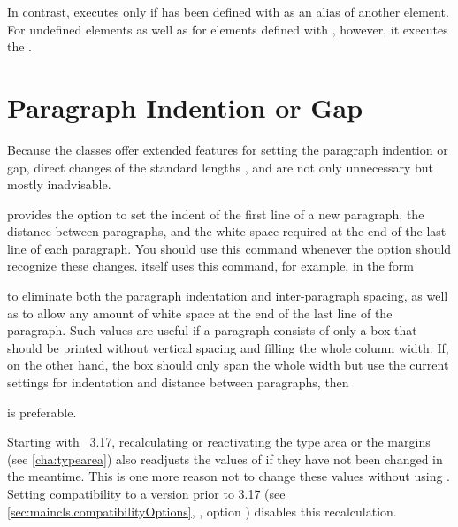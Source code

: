 In contrast,  executes
 only if  has been defined with
 as an alias of another element. For
undefined elements as well as for elements defined with
, however, it executes the
.%
\EndIndexGroup

\section{Paragraph Indention or Gap}

Because the \KOMAScript{} classes offer extended features for setting the
paragraph indention or gap, direct changes of the standard lengths
, 
and  are not only unnecessary but
mostly inadvisable.

\begin{Declaration}
\end{Declaration}
\KOMAScript{} provides the option to set the indent of the first line of a new
paragraph, the distance between paragraphs, and the white space required at the
end of the last line of each paragraph. You should use this command whenever
the  option should recognize these
changes. \KOMAScript{} itself uses this command, for
example, in the form
\begin{lstcode}
\end{lstcode}
to eliminate both the paragraph indentation and inter-paragraph spacing, as
well as to allow any amount of white space at the end of the last line of the
paragraph.  Such values are useful if a paragraph consists of only a box that
should be printed without vertical spacing and filling the whole column
width. If, on the other hand, the box should only span the whole width but use
the current settings for indentation and distance between paragraphs, then
\begin{lstcode}
  \setlength{\parfillskip}{0pt plus 1fil}
\end{lstcode}
is preferable.

Starting with \KOMAScript~3.17, recalculating or
reactivating the type area or the margins (see
\autoref{cha:typearea}) also readjusts the values of  if
they have not been changed in the meantime. This is one more reason not to
change these values without using \KOMAScript. Setting compatibility to a
\KOMAScript{} version prior to 3.17 (see
\autoref{sec:maincls.compatibilityOptions},
, option %
)
disables this recalculation.%
%
\EndIndexGroup

